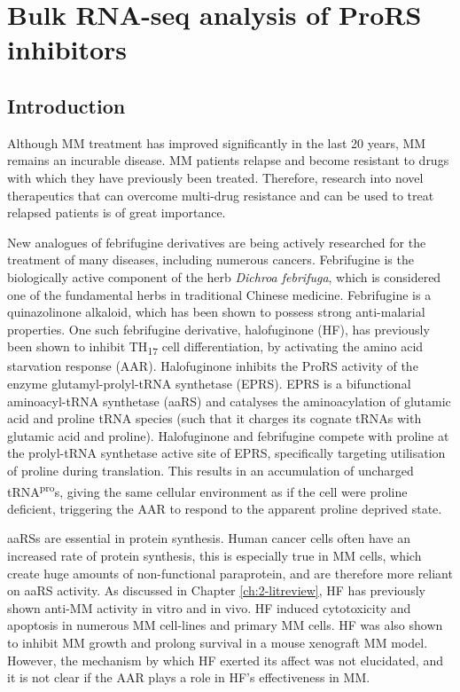 \chapter{Bulk RNA-seq analysis of ProRS inhibitors}\label{ch:5-bulk}


\section{Introduction}
Although MM treatment has improved significantly in the last 20 years, MM remains an incurable disease.
MM patients relapse and become resistant to drugs with which they have previously been treated.
Therefore, research into novel therapeutics that can overcome multi-drug resistance and can be used to treat relapsed patients is of great importance.

New analogues of febrifugine derivatives are being actively researched for the treatment of many diseases, including numerous cancers\cite{halo2012clin, halo2012clin2}.
Febrifugine is the biologically active component of the herb \textit{Dichroa febrifuga}, which is considered one of the fundamental herbs in traditional Chinese medicine\cite{koepfli1949alkaloids}.
Febrifugine is a quinazolinone alkaloid, which has been shown to possess strong anti-malarial properties.
One such febrifugine derivative, halofuginone (HF), has previously been shown to inhibit TH\textsubscript{17} cell differentiation, by activating the amino acid starvation response (AAR)\cite{sundrud2009halofuginone}.
Halofuginone inhibits the ProRS activity of the enzyme glutamyl-prolyl-tRNA synthetase (EPRS)\cite{keller2012halofuginone}.
EPRS is a bifunctional aminoacyl-tRNA synthetase (aaRS) and catalyses the aminoacylation of glutamic acid and proline tRNA species (such that it charges its cognate tRNAs with glutamic acid and proline).
Halofuginone and febrifugine compete with proline at the prolyl-tRNA synthetase active site of EPRS, specifically targeting utilisation of proline during translation\cite{keller2012halofuginone}.
This results in an accumulation of uncharged tRNA\textsuperscript{pro}s, giving the same cellular environment as if the cell were proline deficient, triggering the AAR to respond to the apparent proline deprived state.

aaRSs are essential in protein synthesis.
Human cancer cells often have an increased rate of protein synthesis, this is especially true in MM cells, which create huge amounts of non-functional paraprotein, and are therefore more reliant on aaRS activity.
As discussed in Chapter \ref{ch:2-litreview}, HF has previously shown anti-MM activity in vitro and in vivo\cite{leiba2012halofuginone}.
HF induced cytotoxicity and apoptosis in numerous MM cell-lines and primary MM cells.
HF was also shown to inhibit MM growth and prolong survival in a mouse xenograft MM model.
However, the mechanism by which HF exerted its affect was not elucidated, and it is not clear if the AAR plays a role in HF's effectiveness in MM\@.


